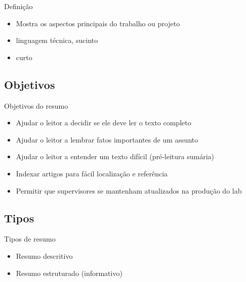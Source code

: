 \documentclass{beamer}
\begin{document}
\begin{frame}{Definição}
  \begin{itemize}
  \item Mostra os aspectos principais do trabalho ou projeto
  \item linguagem técnica, sucinto
  \item curto
  \end{itemize}
\end{frame}

\subsection{Objetivos}

\begin{frame}{Objetivos do resumo}
  \begin{itemize}
  \item Ajudar o leitor a decidir se ele deve ler o texto completo


  \item Ajudar o leitor a lembrar fatos importantes de um assunto


  \item Ajudar o leitor a entender um texto difícil (pré-leitura
    sumária)

  \item Indexar artigos para fácil localização e referência

  \item Permitir que supervisores se mantenham atualizados na produção
    do lab
  \end{itemize}
\end{frame}

\subsection{Tipos}

\begin{frame}{Tipos de resumo}
  \begin{itemize}
  \item Resumo descritivo
  \item Resumo estruturado (informativo)
  \end{itemize}
\end{frame}
\end{document}
